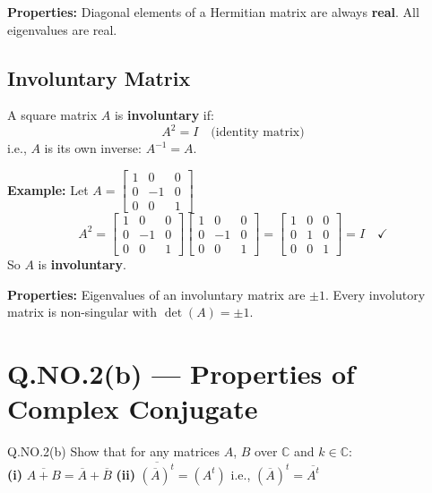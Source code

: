 \documentclass[12pt]{article}
\newcommand{\mat}[1]{\begin{bmatrix}#1\end{bmatrix}}
\begin{document}
\begin{keybox}
\textbf{Properties:} Diagonal elements of a Hermitian matrix are always \textbf{real}. All eigenvalues are real.
\end{keybox}

\subsection{Involuntary Matrix}

\begin{defbox}
A square matrix $A$ is \textbf{involuntary} if:
\[
  A^2 = I \quad \text{(identity matrix)}
\]
i.e., $A$ is its own inverse: $A^{-1} = A$.
\end{defbox}

\begin{proofbox}
\textbf{Example:} Let $A = \mat{1&0&0\\0&-1&0\\0&0&1}$
\[
  A^2 = \mat{1&0&0\\0&-1&0\\0&0&1}\mat{1&0&0\\0&-1&0\\0&0&1}
       = \mat{1&0&0\\0&1&0\\0&0&1} = I \quad \checkmark
\]
So $A$ is \textbf{involuntary}.
\end{proofbox}

\begin{keybox}
\textbf{Properties:} Eigenvalues of an involuntary matrix are $\pm 1$. Every involutory matrix is non-singular with $\det(A) = \pm 1$.
\end{keybox}

\newpage

\section{Q.NO.2(b) — Properties of Complex Conjugate}

\begin{qbox}{Q.NO.2(b)}
Show that for any matrices $A$, $B$ over $\mathbb{C}$ and $k \in \mathbb{C}$:\\[4pt]
\textbf{(i)} $\overline{A+B} = \overline{A} + \overline{B}$ \qquad \textbf{(ii)} $\overline{(\overline{A})^t} = (A^t)$ \quad i.e., $(\overline{A})^t = \overline{A^t}$
\end{qbox}
\end{document}
